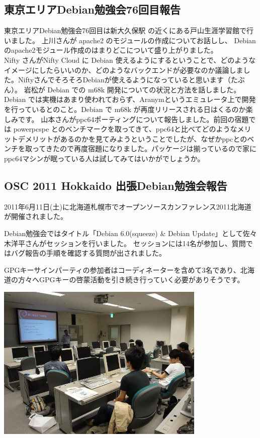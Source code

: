 \documentclass[mingoth,a4paper]{jsarticle}
\begin{document}
\subsection{東京エリアDebian勉強会76回目報告}

東京エリアDebian勉強会76回目は新大久保駅
の近くにある戸山生涯学習館で行いました。
上川さんが apache2 のモジュールの作成についてお話しし、
Debian のapache2モジュール作成のはまりどこについて盛り上がりました。\\
Nifty さんがNifty Cloud に Debian 
使えるようにするということで、どのようなイメージにしたらいいのか、どのようなバックエンドが必要なのか議論しました。NiftyさんでそろそろDebianが使えるようになっていると思います（たぶん）。
岩松が Debian での m68k 開発についての状況と方法を話しました。Debian では実機はあまり使われておらず、Aranymというエミュレータ上で開発を行っているとのこと。Debian で m68k が再度リリースされる日はくるのか楽しみです。
山本さんがppc64ポーティングについて報告しました。前回の宿題では powerpcspe とのベンチマークを取ってきて、ppc64と比べてどのようなメリットデメリットがあるのかを見てみようということでしたが、なぜかppcとのベンチを取ってきたので再度宿題になりました。パッケージは揃っているので家にppc64マシンが眠っている人は試してみてはいかがでしょうか。



\subsection{OSC 2011 Hokkaido 出張Debian勉強会報告}
2011年6月11日(土)に北海道札幌市でオープンソースカンファレンス2011北海道が開催されました。

Debian勉強会ではタイトル「Debian 6.0(squeeze) \& Debian Update」として佐々木洋平さんがセッションを行いました。
セッションには14名が参加し、質問ではバグ報告の手順を確認する質問が出されました。


GPGキーサインパーティの参加者はコーディネーターを含めて3名であり、北海道の方々へGPGキーの啓蒙活動を引き続き行っていく必要がありそうです。

\begin{center}
\includegraphics[width=10cm]{image201106/osc11do.jpg}
\end{center}
\end{document}
